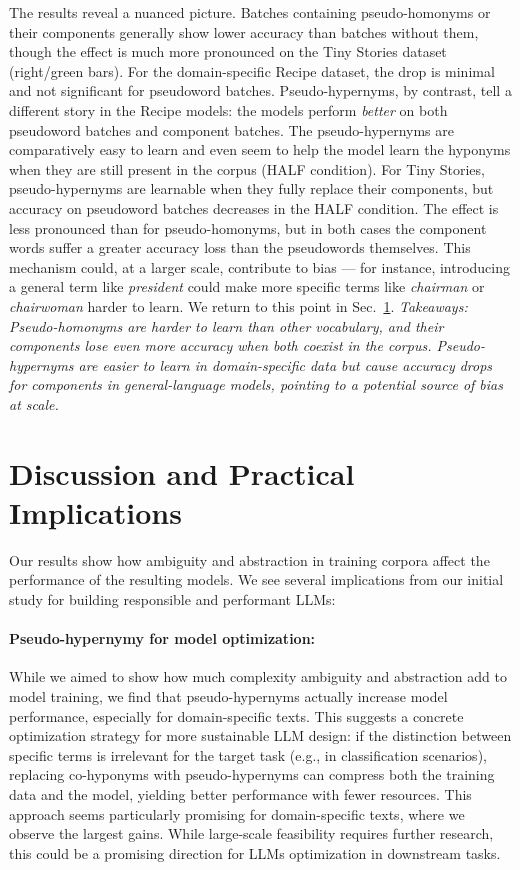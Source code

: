 \documentclass[final]{clv2025}
\begin{document}
The results reveal a nuanced picture. Batches containing pseudo-homonyms or their components generally show lower accuracy than batches without them, though the effect is much more pronounced on the Tiny Stories dataset (right/green bars). For the domain-specific Recipe dataset, the drop is minimal and not significant for pseudoword batches. Pseudo-hypernyms, by contrast, tell a different story in the Recipe models: the models perform \emph{better} on both pseudoword batches and component batches. The pseudo-hypernyms are comparatively easy to learn and even seem to help the model learn the hyponyms when they are still present in the corpus (HALF condition). For Tiny Stories, pseudo-hypernyms are learnable when they fully replace their components, but accuracy on pseudoword batches decreases in the HALF condition. The effect is less pronounced than for pseudo-homonyms, but in both cases the component words suffer a greater accuracy loss than the pseudowords themselves. This mechanism could, at a larger scale, contribute to bias — for instance, introducing a general term like \emph{president} could make more specific terms like \emph{chairman} or \emph{chairwoman} harder to learn. We return to this point in Sec.~\ref{sec:discussion}.
\emph{Takeaways: Pseudo-homonyms are harder to learn than other vocabulary, and their components lose even more accuracy when both coexist in the corpus. Pseudo-hypernyms are easier to learn in domain-specific data but cause accuracy drops for components in general-language models, pointing to a potential source of bias at scale.}


\section{Discussion and Practical Implications} \label{sec:discussion}
Our results show how ambiguity and abstraction in training corpora affect the performance of the resulting models. We see several implications from our initial study for building responsible and performant LLMs:
\paragraph{Pseudo-hypernymy for model optimization:} While we aimed to show how much complexity ambiguity and abstraction add to model training, we find that pseudo-hypernyms actually increase model performance, especially for domain-specific texts. 
This suggests a concrete optimization strategy for more sustainable LLM design: if the distinction between specific terms is irrelevant for the target task (e.g., in classification scenarios), replacing co-hyponyms with pseudo-hypernyms can compress both the training data and the model, yielding better performance with fewer resources. This approach seems particularly promising for domain-specific texts, where we observe the largest gains. While large-scale feasibility requires further research, this could be a promising direction for LLMs optimization in downstream tasks.
\end{document}
